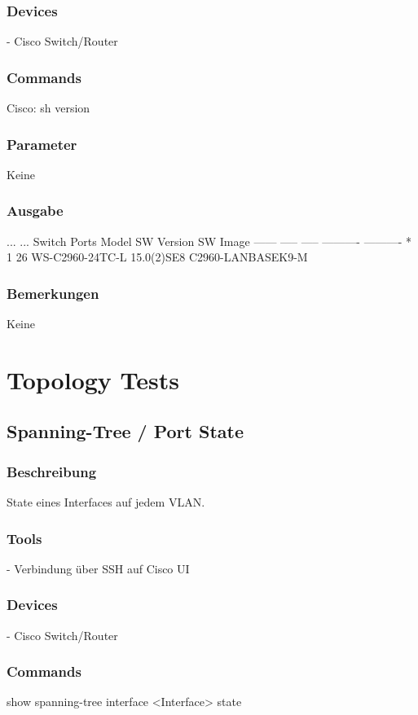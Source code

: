 \documentclass[a4,12pt]{scrartcl}
\begin{document}
\subsubsection{Devices}
- Cisco Switch/Router
\subsubsection{Commands}
Cisco: sh version
\subsubsection{Parameter}
Keine
\subsubsection{Ausgabe}
...\newline
...\newline
Switch Ports Model              SW Version            SW Image\newline
------ ----- -----              ----------            ----------\newline
*    1 26    WS-C2960-24TC-L    15.0(2)SE8            C2960-LANBASEK9-M\newline
\subsubsection{Bemerkungen}
Keine

\newpage
\section{Topology Tests}

\subsection{Spanning-Tree / Port State}
\subsubsection{Beschreibung}
State eines Interfaces auf jedem VLAN.
\subsubsection{Tools}
- Verbindung über SSH auf Cisco UI 
\subsubsection{Devices}
- Cisco Switch/Router
\subsubsection{Commands}
show spanning-tree interface <Interface> state
\end{document}
